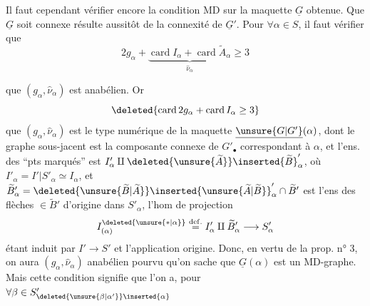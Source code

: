 Il faut cependant vérifier encore la condition MD sur la maquette $\underline G$ obtenue. Que $\underline G$ soit connexe résulte aussitôt de la connexité de $\underline G'$. Pour $\forall\alpha\in S$, il faut vérifier que
\[
2g_\alpha+\underbrace{\operatorname{card}I_\alpha+\operatorname{card}\widetilde A_\alpha}_{\widehat\nu_\alpha}\geq3
\]

 que $(g_\alpha,\widehat\nu_\alpha)$ est anabélien. Or
\[
\deleted{\operatorname{card}2g_\alpha+\operatorname{card}I_\alpha\geq3}
\]
 que $(g_\alpha,\widehat\nu_\alpha)$ est le type numérique de la maquette $\underline{\unsure{G|G'}}(\alpha)$, dont le graphe sous-jacent est la composante connexe de $G'_\bullet$ correspondant à $\alpha$, et l'ens. des ``pts marqués'' est $I'_\alpha\amalg\deleted{\unsure{\widetilde A}}\inserted{\widetilde B}'_\alpha$,  où $I'_\alpha=I'|S'_\alpha\simeq I_\alpha$, et $\widetilde B'_\alpha=\deleted{\unsure{\widetilde B|\widetilde A}}\inserted{\unsure{\widetilde A|\widetilde B}}'_\alpha\cap\widetilde B'$ est l'ens des flèches $\in\widetilde B'$ d'origine dans $S'_\alpha$, l'hom de projection
\[
I_{(\alpha)}^{\deleted{\unsure{\ast|\alpha}}}\overset{\mathrm{def.}}{=}I'_\alpha\amalg\widetilde B'_\alpha\longrightarrow S'_\alpha
\]
étant induit par $I'\to S'$ et l'application origine. Donc, en vertu de la prop.  n° 3, on aura $(g_\alpha,\widehat\nu_\alpha)$ anabélien pourvu qu'on sache que $\underline G(\alpha)$ est un MD-graphe. Mais cette condition signifie que l'on a, pour $\forall\beta\in S'_{\deleted{\unsure{\beta|\alpha'}}\inserted{\alpha}}$
